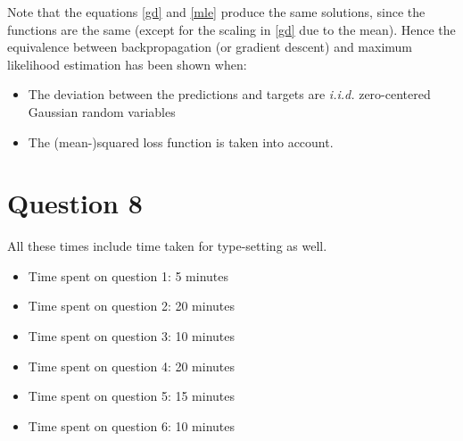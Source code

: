 \documentclass{article}
\begin{document}
\begin{flushleft}
Note that the equations \ref{gd} and \ref{mle} produce the same solutions, since the functions are the same (except for the scaling in \ref{gd} due to the mean). Hence the equivalence between backpropagation (or gradient descent) and maximum likelihood estimation has been shown when:
\begin{itemize}
\item The deviation between the predictions and targets are \textit{i.i.d.} zero-centered Gaussian random variables
\item The (mean-)squared loss function is taken into account.
\end{itemize}
\end{flushleft}

\section*{Question 8}
All these times include time taken for type-setting as well.
\begin{itemize}
\item Time spent on question 1: 5 minutes
\item Time spent on question 2: 20 minutes
\item Time spent on question 3: 10 minutes
\item Time spent on question 4: 20 minutes
\item Time spent on question 5: 15 minutes
\item Time spent on question 6: 10 minutes
\end{itemize}
\end{document}
